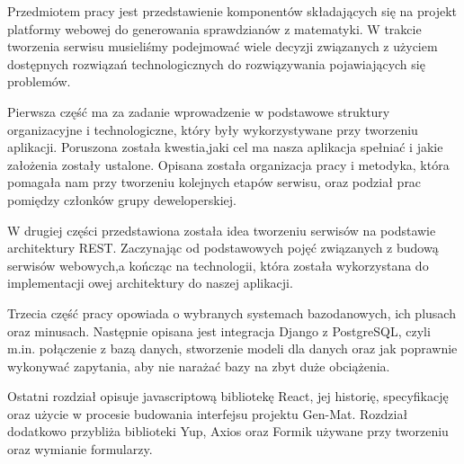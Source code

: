 \documentclass[oneside,polski,logo,indent]{amuthesis}
\date{Poznań, \today{} r.}
\begin{document}
\maketitle
\makestatement

\begin{streszczenie}
Przedmiotem pracy jest przedstawienie komponentów składających się na projekt platformy webowej do generowania sprawdzianów z matematyki. W trakcie tworzenia serwisu musieliśmy podejmować wiele decyzji związanych z użyciem dostępnych rozwiązań technologicznych do rozwiązywania pojawiających się problemów.

Pierwsza część ma za zadanie wprowadzenie w podstawowe struktury organizacyjne i technologiczne, który były wykorzystywane przy tworzeniu aplikacji. Poruszona została kwestia,\break jaki cel ma nasza aplikacja spełniać i jakie założenia zostały ustalone. Opisana została organizacja pracy i metodyka, która pomagała nam przy tworzeniu kolejnych etapów serwisu, oraz podział prac pomiędzy członków grupy deweloperskiej.

W drugiej części przedstawiona została idea tworzeniu serwisów na podstawie architektury REST. Zaczynając od podstawowych pojęć związanych z budową serwisów webowych,\break a kończąc na technologii, która została wykorzystana do implementacji owej architektury do naszej aplikacji.

Trzecia część pracy opowiada o wybranych systemach bazodanowych, ich plusach oraz minusach. Następnie opisana jest integracja Django z PostgreSQL, czyli m.in. połączenie z bazą danych, stworzenie modeli dla danych oraz jak poprawnie wykonywać zapytania, aby nie narażać bazy na zbyt duże obciążenia.

Ostatni rozdział opisuje javascriptową bibliotekę React, jej historię, specyfikację oraz użycie w procesie budowania interfejsu projektu Gen-Mat. Rozdział dodatkowo przybliża biblioteki Yup, Axios oraz Formik używane przy tworzeniu oraz wymianie formularzy.

\end{streszczenie}


\tableofcontents

\end{document}
